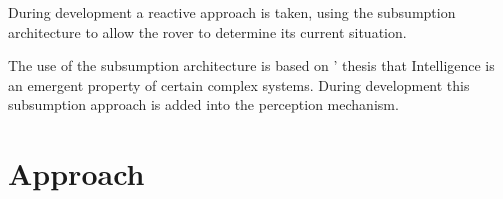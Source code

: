 \documentclass[a4paper,12pt,twocolumn]{report}
\begin{document}
During development a reactive approach is taken, using the subsumption architecture \citep{wooldridge2009introduction} to allow the rover to determine its current situation.

The use of the subsumption architecture is based on \cite{brooks1991intelligence}' thesis that Intelligence is an emergent property of certain complex systems. During development this subsumption approach is added into the perception mechanism.

\section{Approach}




\end{document}
